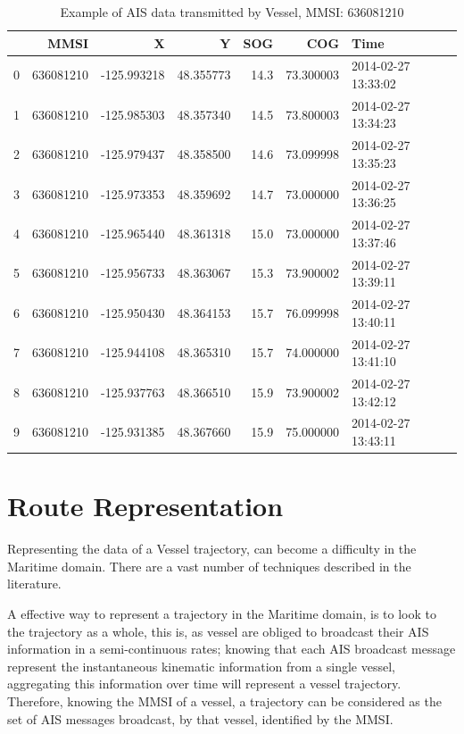 \begin{table}[H]
\centering
{\small
\begin{tabular}{lrrrrrl}
\toprule
{} &       MMSI &           X &          Y &   SOG &        COG &                Time \\
\midrule
0 &  636081210 & -125.993218 &  48.355773 &  14.3 &  73.300003 & 2014-02-27 13:33:02 \\
1 &  636081210 & -125.985303 &  48.357340 &  14.5 &  73.800003 & 2014-02-27 13:34:23 \\
2 &  636081210 & -125.979437 &  48.358500 &  14.6 &  73.099998 & 2014-02-27 13:35:23 \\
3 &  636081210 & -125.973353 &  48.359692 &  14.7 &  73.000000 & 2014-02-27 13:36:25 \\
4 &  636081210 & -125.965440 &  48.361318 &  15.0 &  73.000000 & 2014-02-27 13:37:46 \\
5 &  636081210 & -125.956733 &  48.363067 &  15.3 &  73.900002 & 2014-02-27 13:39:11 \\
6 &  636081210 & -125.950430 &  48.364153 &  15.7 &  76.099998 & 2014-02-27 13:40:11 \\
7 &  636081210 & -125.944108 &  48.365310 &  15.7 &  74.000000 & 2014-02-27 13:41:10 \\
8 &  636081210 & -125.937763 &  48.366510 &  15.9 &  73.900002 & 2014-02-27 13:42:12 \\
9 &  636081210 & -125.931385 &  48.367660 &  15.9 &  75.000000 & 2014-02-27 13:43:11 \\
\bottomrule
\end{tabular} }
\caption{Example of AIS data transmitted by Vessel, MMSI: 636081210}
\label{Table: TableAIS1}
\end{table}


\section{Route Representation}
Representing the data of a Vessel trajectory, can become a difficulty in the Maritime domain. There are a vast number of techniques described in the literature.

A effective way to represent a trajectory in the Maritime domain, is to look to the trajectory as a whole, this is, as vessel are obliged to broadcast their AIS information in a semi-continuous rates; knowing that each AIS broadcast message represent the instantaneous kinematic information from a single vessel, aggregating this information over time will represent a vessel trajectory. Therefore, knowing the MMSI of a vessel, a trajectory can be considered as the set of AIS messages broadcast, by that vessel, identified by the MMSI.


